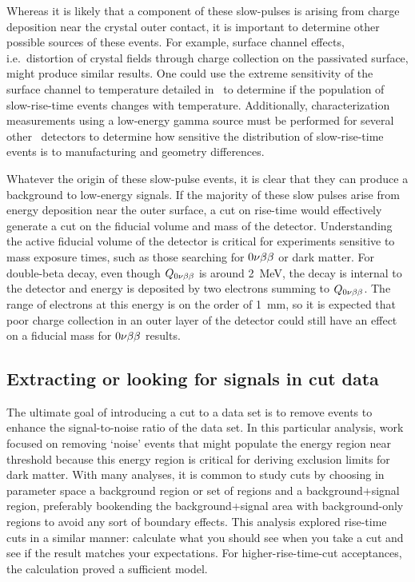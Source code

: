 Whereas it is likely that a component of these slow-pulses is arising from charge deposition near the crystal outer contact, it is important to determine other possible sources of these events.  For example, surface channel effects, i.e.~distortion of crystal fields through charge collection on the passivated surface, might produce similar results.  One could use the extreme sensitivity of the surface channel to temperature detailed in~\cite{Hull1995488} to determine if the population of slow-rise-time events changes with temperature.  Additionally, characterization measurements using a low-energy gamma source must be performed for several other \ppc~detectors to determine how sensitive the distribution of slow-rise-time events is to manufacturing and geometry differences.  

Whatever the origin of these slow-pulse events, it is clear that they can produce a background to low-energy signals.  If the majority of these slow pulses arise from energy deposition near the outer surface, a cut on rise-time would effectively generate a cut on the fiducial volume and mass of the detector.  Understanding the active fiducial volume of the detector is critical for experiments sensitive to mass exposure times, such as those searching for $0 \nu \beta \beta$ or dark matter.  For double-beta decay, even though $Q_{0 \nu \beta \beta}$ is around 2~MeV, the decay is internal to the detector and energy is deposited by two electrons summing to $Q_{0 \nu \beta \beta}$.  The range of electrons at this energy is on the order of 1~mm, so it is expected that poor charge collection in an outer layer of the detector could still have an effect on a fiducial mass for $0 \nu \beta \beta$ results.  


	\subsection{Extracting or looking for signals in cut data}
	\label{sec:BeGeLowEnergyFeatures}
	
	The ultimate goal of introducing a cut to a data set is to remove events to enhance the signal-to-noise ratio of the data set.  In this particular analysis, work focused on removing `noise' events that might populate the energy region near threshold because this energy region is critical for deriving exclusion limits for dark matter.  With many analyses, it is common to study cuts by choosing in parameter space a background region or set of regions and a background+signal region, preferably bookending the background+signal area with background-only regions to avoid any sort of boundary effects.   This analysis explored rise-time cuts in a similar manner: calculate what you should see when you take a cut and see if the result matches your expectations.  For higher-rise-time-cut acceptances, the calculation proved a sufficient model.  
	
